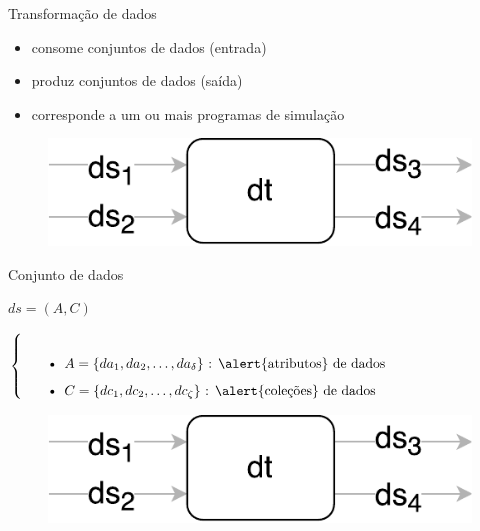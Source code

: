 \documentclass[12pt,compress]{beamer}
\begin{document}
\begin{frame}[t]{Transformação de dados}

\begin{itemize}
\item \alert{consome} conjuntos de dados (entrada)
\item \alert{produz} conjuntos de dados (saída)
\item corresponde a um ou mais \alert{programas} de simulação
\end{itemize}

\vfill

\begin{figure}
\includegraphics[width=.5\textwidth]{img/example-data-transformation.pdf}
\end{figure}

\end{frame}


\begin{frame}[t]{Conjunto de dados}

\centerline{$ds = (A, C)$}

$\left\{
\begin{tabular}{p{\textwidth}}
\begin{itemize}
    \item \( A = \{da_1, da_2, \ldots, da_{\delta} \} \) : \alert{atributos} de dados
    \item \( C = \{dc_1, dc_2, \ldots, dc_{\zeta} \} \) : \alert{coleções} de dados
\end{itemize}
\end{tabular}
\right.$

\vfill

\begin{figure}
\includegraphics[width=.5\textwidth]{img/example-data-transformation.pdf}
\end{figure}

\end{frame}
\end{document}
